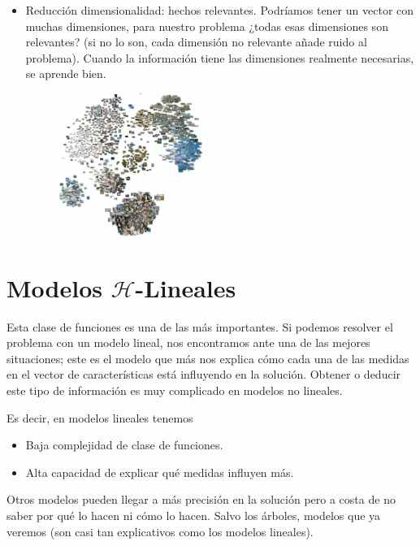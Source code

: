 \documentclass[11pt,a4paper]{article}
\theoremstyle{definition}
\begin{document}
\begin{itemize}
\begin{itemize}
			\item Reducción dimensionalidad: hechos relevantes. Podríamos tener un vector con muchas dimensiones, para nuestro problema ¿todas esas dimensiones son relevantes? (si no lo son, cada dimensión no relevante añade ruido al problema). Cuando la información tiene las dimensiones realmente necesarias, se aprende bien.
			\begin{figure}[htb!]
			\centering
			\includegraphics[width=0.45\textwidth]{images/dimensionality}
		\end{figure}
		\end{itemize}
		
	\end{itemize}
	
	\newpage
	
	
	\section{Modelos $\mathcal{H}$-Lineales}
	Esta clase de funciones es una de las más importantes. Si podemos resolver el problema con un modelo lineal, nos encontramos ante una de las mejores situaciones; este es el modelo que más nos explica cómo cada una de las medidas  en el vector de características está influyendo en la solución. Obtener o deducir este tipo de información es muy complicado en modelos no lineales.
	
	Es decir, en modelos lineales tenemos
	
	\begin{itemize}
		\item Baja complejidad de clase de funciones.
		\item Alta capacidad de explicar qué medidas influyen más.
	\end{itemize}
	
	Otros modelos pueden llegar a más precisión en la solución pero a costa de no saber por qué lo hacen ni cómo lo hacen. Salvo los árboles, modelos que ya veremos (son casi tan explicativos como los modelos lineales).
	
\end{document}
